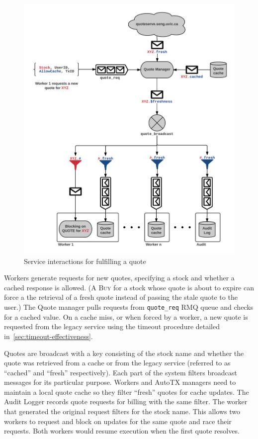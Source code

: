 \begin{figure}[tbph]
  \centering
  \includegraphics[width=0.85\linewidth]{graphics/arch-quotes}
  \caption{Service interactions for fulfilling a quote}
  \label{fig:arch-quotes}
\end{figure}

Workers generate requests for new quotes, specifying a stock and whether a cached response is allowed. (A \textsc{Buy} for a stock whose quote is about to expire can force a the retrieval of a fresh quote instead of passing the stale quote to the user.) The Quote manager pulls requests from \texttt{quote\_req} RMQ queue and checks for a cached value. On a cache miss, or when forced by a worker, a new quote is requested from the legacy service using the timeout procedure detailed in~\ref{sec:timeout-effectiveness}.

Quotes are broadcast with a key consisting of the stock name and whether the quote was retrieved from a cache or from the legacy service (referred to as ``cached'' and ``fresh'' respectively). Each part of the system filters broadcast messages for its particular purpose. Workers and AutoTX managers need to maintain a local quote cache so they filter ``fresh'' quotes for cache updates. The Audit Logger records quote requests for billing with the same filter. The worker that generated the original request filters for the stock name. This allows two workers to request and block on updates for the same quote and race their requests. Both workers would resume execution when the first quote resolves.


